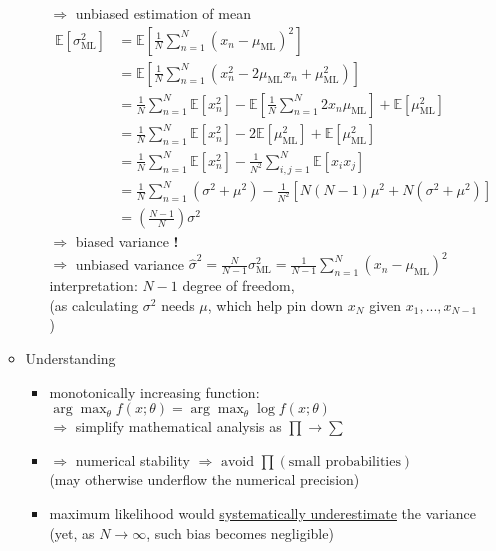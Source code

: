 \begin{itemize}
\begin{itemize}
\begin{itemize}
		$\Rightarrow$ unbiased estimation of mean
		\Item \begin{align*} \mathbb E[\sigma_\text{ML}^2] &= \mathbb E[\frac 1N \sum_{n=1}^N(x_n-\mu_{\text{ML}})^2] \\
		&= \mathbb E [ \frac 1N \sum_{n=1}^{N}(x_n^2-2\mu_\text{ML}x_n+\mu_\text{ML}^2) ] \\ 
		&= \frac 1N \sum_{n=1}^N \mathbb E[x_n^2] - \mathbb E[\frac 1N \sum_{n=1}^N 2x_n \mu_\text{ML}] + \mathbb E[\mu_\text{ML}^2] \\ 
		&= \frac 1N \sum_{n=1}^N \mathbb E[x_n^2] - 2\mathbb E[\mu_\text{ML}^2] + \mathbb E[\mu_\text{ML}^2] \\
		&= \frac 1N \sum_{n=1}^N \mathbb E[x_n^2] - \frac 1{N^2} \sum_{i,j=1}^N \mathbb E[x_ix_j] \\
		&= \frac 1N \sum_{n=1}^N (\sigma^2 + \mu^2) - \frac 1{N^2} [N(N-1)\mu^2 + N(\sigma^2+\mu^2)] \tag{by 2nd moment of Gaussian \(\mathbb E[x^2]\) and i.i.d assumption} \\
		&= \left(\frac {N-1}N  \right) \sigma^2 \end{align*}
		$\Rightarrow$ biased variance \textbf{!} \\
		$\Rightarrow $ unbiased variance $\displaystyle \hat \sigma^2 = \frac N {N-1}\sigma^2_\text{ML} = \frac 1{N-1} \sum_{n=1}^N (x_n-\mu_\text{ML})^2 $ \\
		interpretation: $N-1$  degree of freedom, \\
		(as calculating $\sigma^2$ needs $\mu$, which help pin down $x_N$ given $x_1,...,x_{N-1}$)
		\end{itemize}
	\item Understanding
		\begin{itemize}
		\item monotonically increasing function: $\arg\max_{\theta}f(x;\theta) = \arg\max_\theta\log f(x;\theta)$ \\
		$\Rightarrow$ simplify mathematical analysis as $\prod \rightarrow \sum$
		\item $\Rightarrow$ numerical stability $\Rightarrow \text{ avoid } \prod (\text{small probabilities})$ \\		
		(may otherwise underflow the numerical precision)
		\item maximum likelihood would \underline{systematically underestimate} the variance \\
		(yet, as $N\rightarrow \infty$, such bias becomes negligible)
		\end{itemize}
	\end{itemize}
\end{itemize}

